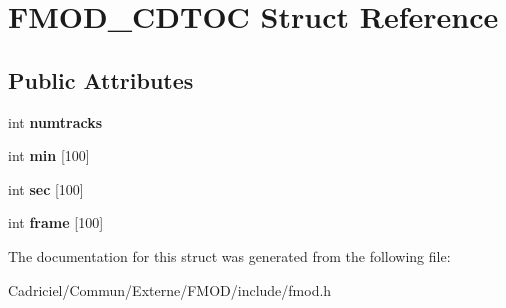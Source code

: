 \hypertarget{struct_f_m_o_d___c_d_t_o_c}{}\section{F\+M\+O\+D\+\_\+\+C\+D\+T\+OC Struct Reference}
\label{struct_f_m_o_d___c_d_t_o_c}
\subsection*{Public Attributes}
\begin{DoxyCompactItemize}
\item 
int {\bfseries numtracks}\hypertarget{struct_f_m_o_d___c_d_t_o_c_aad0a3526919d1d67958c47179a73cf7b}{}\label{struct_f_m_o_d___c_d_t_o_c_aad0a3526919d1d67958c47179a73cf7b}

\item 
int {\bfseries min} \mbox{[}100\mbox{]}\hypertarget{struct_f_m_o_d___c_d_t_o_c_ac32672636e86e7d5da6cd02737123f0e}{}\label{struct_f_m_o_d___c_d_t_o_c_ac32672636e86e7d5da6cd02737123f0e}

\item 
int {\bfseries sec} \mbox{[}100\mbox{]}\hypertarget{struct_f_m_o_d___c_d_t_o_c_a20dcf991841f7f4322904f9a1175e7c6}{}\label{struct_f_m_o_d___c_d_t_o_c_a20dcf991841f7f4322904f9a1175e7c6}

\item 
int {\bfseries frame} \mbox{[}100\mbox{]}\hypertarget{struct_f_m_o_d___c_d_t_o_c_a40e8bdc25c765a02c4ca0af13c74dc5f}{}\label{struct_f_m_o_d___c_d_t_o_c_a40e8bdc25c765a02c4ca0af13c74dc5f}

\end{DoxyCompactItemize}


The documentation for this struct was generated from the following file\+:\begin{DoxyCompactItemize}
\item 
Cadriciel/\+Commun/\+Externe/\+F\+M\+O\+D/include/fmod.\+h\end{DoxyCompactItemize}
